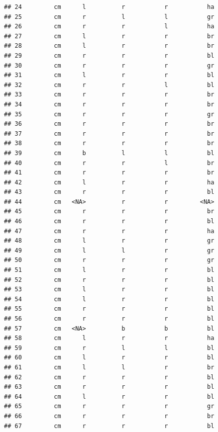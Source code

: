 \documentclass[]{article}
\begin{document}
\begin{verbatim}
## 24         cm      l          r           r           ha
## 25         cm      r          l           l           gr
## 26         cm      r          r           l           ha
## 27         cm      l          r           r           br
## 28         cm      l          r           r           br
## 29         cm      r          r           r           bl
## 30         cm      r          r           r           gr
## 31         cm      l          r           r           bl
## 32         cm      r          r           l           bl
## 33         cm      r          r           r           br
## 34         cm      r          r           r           br
## 35         cm      r          r           r           gr
## 36         cm      r          r           r           br
## 37         cm      r          r           r           br
## 38         cm      r          r           r           br
## 39         cm      b          l           l           bl
## 40         cm      r          r           l           br
## 41         cm      r          r           r           br
## 42         cm      l          r           r           ha
## 43         cm      r          r           r           bl
## 44         cm   <NA>          r           r         <NA>
## 45         cm      r          r           r           br
## 46         cm      r          r           r           bl
## 47         cm      r          r           r           ha
## 48         cm      l          r           r           gr
## 49         cm      l          l           r           gr
## 50         cm      r          r           r           gr
## 51         cm      l          r           r           bl
## 52         cm      r          r           r           bl
## 53         cm      l          r           r           bl
## 54         cm      l          r           r           bl
## 55         cm      r          r           r           bl
## 56         cm      r          r           r           bl
## 57         cm   <NA>          b           b           bl
## 58         cm      l          r           r           ha
## 59         cm      r          l           l           bl
## 60         cm      l          r           r           bl
## 61         cm      l          l           r           br
## 62         cm      r          r           r           bl
## 63         cm      r          r           r           bl
## 64         cm      l          r           r           bl
## 65         cm      r          r           r           gr
## 66         cm      r          r           r           br
## 67         cm      r          r           r           bl

\end{verbatim}
\end{document}
